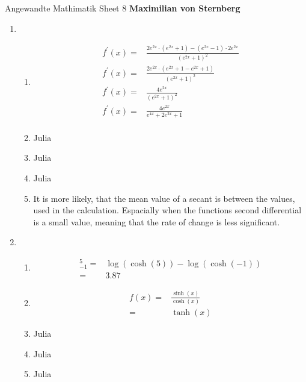\documentclass[]{book}
\theoremstyle{definition}
\begin{document}
\begin{center}
{\Large Angewandte Mathimatik \hspace{0.5cm} Sheet 8}
\textbf{Maximilian von Sternberg} %
\end{center}

\vspace{0.2 cm}

\begin{enumerate}
    \item \begin{enumerate}
        \item \begin{align*}
            f^\prime(x) = & \frac{2e^{2x} \cdot (e^{2x} + 1) - (e^{2x} - 1) \cdot 2e^{2x}}{(e^{2x} + 1)^2} \\
            f^\prime(x) = & \frac{2e^{2x} \cdot (e^{2x} + 1 - e^{2x} + 1)}{(e^{2x} + 1)^2} \\
            f^\prime(x) = & \frac{4e^{2x}}{(e^{2x} + 1)^2} \\
            f^\prime(x) = & \frac{4e^{2x}}{e^{4x} + 2e^{2x} + 1} \\
        \end{align*}
        \item Julia
        \item Julia
        \item Julia
        \item It is more likely, that the mean value of a secant is between the values, used in the calculation. Espacially when the functions second differential is a small value, meaning that the rate of change is less significant. 
    \end{enumerate}
    \item \begin{enumerate}
        \item \begin{align*}
            [\log(\cosh(x)) + C]^5_{-1} = & \log(\cosh(5)) - \log(\cosh(-1))\\
            = & 3.87
        \end{align*}
        \item \begin{align*}
            f(x) = & \frac{\sinh(x)}{\cosh(x)} \\
             = & \tanh(x)
        \end{align*}
        \item Julia
        \item Julia
        \item Julia

\end{enumerate}
\end{enumerate}
\end{document}
